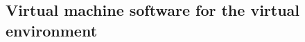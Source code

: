 %
\begin{comment}
\begin{table}[tbh]
	\centering
	\caption{Median absolute percentage error from building a model using the original test results in virtual environments and testing on repeated test results in virtual environments.}
	\label{tab:stabilityvm}
	\resizebox{\columnwidth}{!}{%
		\begin{tabular}{|c||c|c|}
			\hline
			\multirow{2}{*}{\textbf{Validation type}} & \multicolumn{2}{c|}{\textbf{Median absolute percentage error}} \\ \cline{2-3} 
			& \textbf{CloudStore} & \textbf{DS2} \\ %
			\midrule
			\midrule
			Internal validation & 0.03 & 0.09\\ \hline
			External validation with virtual repeated test & 0.04 & 0.13 \\ \hline
		\end{tabular}%
	}
\end{table}
\end{comment}









\subsection{Virtual machine software for the virtual environment}

